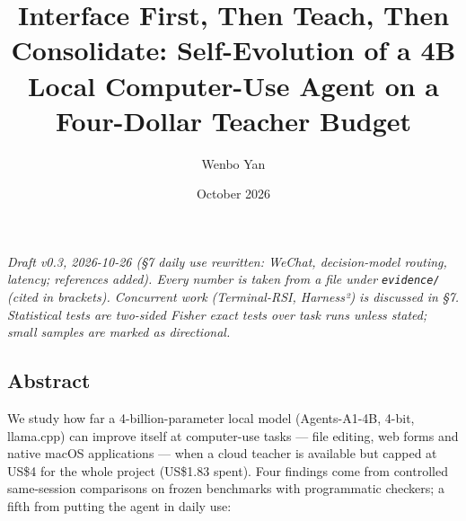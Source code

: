 \documentclass[
  10pt,
]{article}
\title{Interface First, Then Teach, Then Consolidate: Self-Evolution of
a 4B Local Computer-Use Agent on a Four-Dollar Teacher Budget}
\author{Wenbo Yan}
\date{October 2026}
\begin{document}
\maketitle


\emph{Draft v0.3, 2026-10-26 (§7 daily use rewritten: WeChat,
decision-model routing, latency; references added). Every number is
taken from a file under \texttt{evidence/} (cited in brackets).
Concurrent work (Terminal-RSI, Harness²) is discussed in §7. Statistical
tests are two-sided Fisher exact tests over task runs unless stated;
small samples are marked as directional.}

\subsection{Abstract}\label{abstract}

We study how far a 4-billion-parameter local model (Agents-A1-4B, 4-bit,
llama.cpp) can improve itself at computer-use tasks --- file editing,
web forms and native macOS applications --- when a cloud teacher is
available but capped at US\$4 for the whole project (US\$1.83 spent).
Four findings come from controlled same-session comparisons on frozen
benchmarks with programmatic checkers; a fifth from putting the agent in
daily use:
\end{document}
